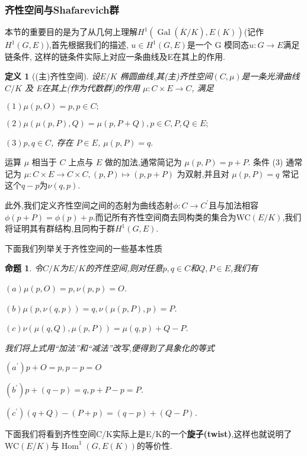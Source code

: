 \documentclass[11pt]{ctexart}
\DeclareMathOperator{\Hom}{Hom}
\DeclareMathOperator{\Gal}{Gal}
\newtheorem{defi}{定义}[section]
\newtheorem{pro}{命题}[section]
\begin{document}
\subsubsection{齐性空间与Shafarevich群}
本节的重要目的是为了从几何上理解$H^1(\Gal(\overline{K}/K),E(K))$(记作$H^1(G,E)$),首先根据我们的描述, $u\in H^1(G,E)$是一个 G 模同态$u:G \rightarrow E$满足链条件, 这样的链条件实际上对应一条曲线及E在其上的作用.
\begin{defi}[(主)齐性空间]
    设$E/K$ 椭圆曲线,其(主)齐性空间$(C,\mu)$是一条光滑曲线 $C/K$ 及 E在其上(作为代数群)的作用 $\mu: C\times E\to C$,
    满足 
    
         $(1)\mu(p,O) = p,p\in C;$

        $(2)\mu(\mu(p,P),Q) = \mu(p,P+Q),p\in C,P,Q\in E;$

         $(3)p,q\in C$, 存在 $P\in E$, $\mu(p,P) = q.$

    \end{defi} 
运算 $\mu$ 相当于 $C$ 上点与 $E$ 做的加法,通常简记为 $\mu(p,P) = p+P$. 
条件 (3) 通常记为 $\mu: C\times E \to C\times C, (p,P)\mapsto (p,p+P)$ 为双射,并且对 $\mu(p,P) = q$ 常记
这个$q-p$为$\nu(q,p)$.

此外,我们定义齐性空间之间的态射为曲线态射$\phi: C\rightarrow C^{\prime}$且与加法相容$\phi(p+P)=\phi(p)+  p$.而记所有齐性空间商去同构类的集合为WC$(E/K)$,我们将证明其有群结构,且同构于群$H^1(G,E)$.

下面我们列举关于齐性空间的一些基本性质
\begin{pro}令$C/K$为$E/K$的齐性空间,则对任意$p,q\in C$和$Q,P\in E$,我们有

    $(a)\mu(p,O)=p,\nu(p,p)=O$.

    $(b)\mu(p,\nu(q,p))=q,\nu(\mu(p,P),p)=P$.

    $(c)\nu(\mu(q,Q),\mu(p,P))=\mu(q,p)+Q-P$.

   \noindent 我们将上式用“加法”和“减法”改写,便得到了具象化的等式

    $(a^{\prime})p+O=p,p-p=O$

    $(b^{\prime})p+(q-p)=q,p+P-p=P$.

    $(c^{\prime})(q+Q)-(P+p)=(q-p)+(Q-P)$.



\end{pro}
下面我们将看到齐性空间C/K实际上是E/K的一个\textbf{旋子(twist)},这样也就说明了WC$(E/K)$与$\Hom^1(G,E(K))$的等价性.
\end{document}
